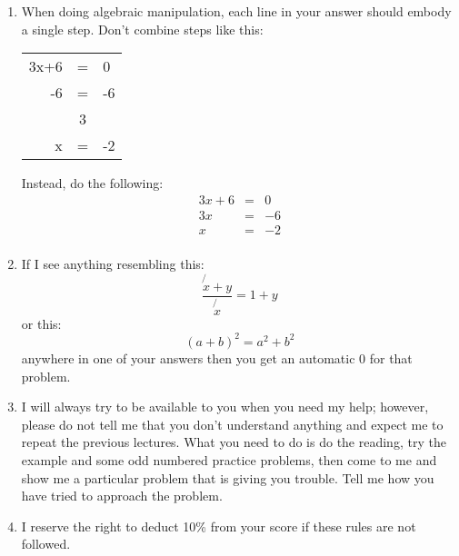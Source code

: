 \documentclass[letterpaper,12pt,fleqn]{article}
\begin{document}
\begin{enumerate}
\item When doing algebraic manipulation, each line in your answer should
  embody a single step. Don't combine steps like this:

\begin{tabular}{rcl}
3x+6 & = & 0 \\
-6 & = & -6 \\
\hline
 & 3 & \\
x & = & -2 \\
\end{tabular}

Instead, do the following:
\begin{eqnarray*}
3x+6 &=& 0 \\
3x &=& -6 \\
x &=& -2 \\
\end{eqnarray*}

\item If I see anything resembling this:
\[\frac{\not{x}+y}{\not{x}} = 1+y\]
or this:
\[(a+b)^2=a^2+b^2\]
anywhere in one of your answers then you get an automatic 0 for that problem.

\item I will always try to be available to you when you need my help; however,
  please do not tell me that you don't understand anything and expect me to
  repeat the previous lectures. What you need to do is do the reading, try
  the example and some odd numbered practice problems, then come to me and show
  me a particular problem that is giving you trouble. Tell me how you have
  tried to approach the problem.

\item I reserve the right to deduct 10\% from your score if these rules are
  not followed.
\end{enumerate}
\end{document}
